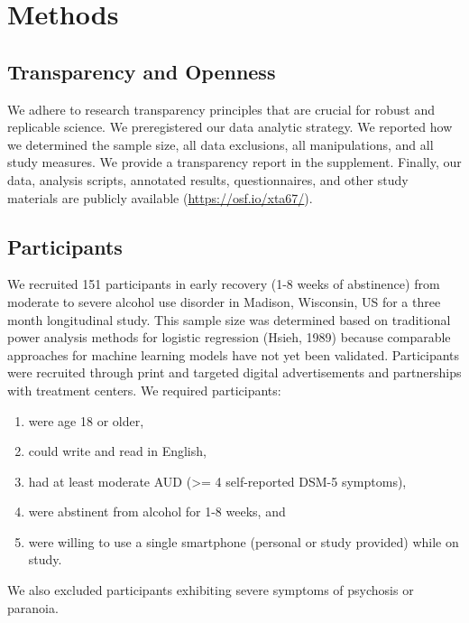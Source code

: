\documentclass[
]{agujournal2019}
\providecommand{\tightlist}{%
  \setlength{\itemsep}{0pt}\setlength{\parskip}{0pt}}\usepackage{longtable,booktabs,array}
\begin{document}
\section{Methods}\label{methods}

\subsection{Transparency and Openness}\label{transparency-and-openness}

We adhere to research transparency principles that are crucial for
robust and replicable science. We preregistered our data analytic
strategy. We reported how we determined the sample size, all data
exclusions, all manipulations, and all study measures. We provide a
transparency report in the supplement. Finally, our data, analysis
scripts, annotated results, questionnaires, and other study materials
are publicly available (\url{https://osf.io/xta67/}).

\subsection{Participants}\label{participants}

We recruited 151 participants in early recovery (1-8 weeks of
abstinence) from moderate to severe alcohol use disorder in Madison,
Wisconsin, US for a three month longitudinal study. This sample size was
determined based on traditional power analysis methods for logistic
regression (Hsieh, 1989) because comparable approaches for machine
learning models have not yet been validated. Participants were recruited
through print and targeted digital advertisements and partnerships with
treatment centers. We required participants:

\begin{enumerate}
\def\labelenumi{\arabic{enumi}.}
\tightlist
\item
  were age 18 or older,
\item
  could write and read in English,
\item
  had at least moderate AUD (\textgreater= 4 self-reported DSM-5
  symptoms),
\item
  were abstinent from alcohol for 1-8 weeks, and
\item
  were willing to use a single smartphone (personal or study provided)
  while on study.
\end{enumerate}

We also excluded participants exhibiting severe symptoms of psychosis or
paranoia.
\end{document}
